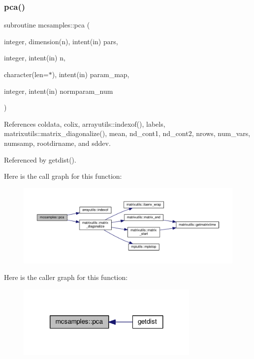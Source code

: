 \subsubsection{\texorpdfstring{pca()}{pca()}}
{\footnotesize\ttfamily subroutine mcsamples\+::pca (\begin{DoxyParamCaption}\item[{integer, dimension(n), intent(in)}]{pars,  }\item[{integer, intent(in)}]{n,  }\item[{character(len=$\ast$), intent(in)}]{param\+\_\+map,  }\item[{integer, intent(in)}]{normparam\+\_\+num }\end{DoxyParamCaption})}



References coldata, colix, arrayutils\+::indexof(), labels, matrixutils\+::matrix\+\_\+diagonalize(), mean, nd\+\_\+cont1, nd\+\_\+cont2, nrows, num\+\_\+vars, numsamp, rootdirname, and sddev.



Referenced by getdist().

Here is the call graph for this function\+:
\nopagebreak
\begin{figure}[H]
\begin{center}
\leavevmode
\includegraphics[width=350pt]{namespacemcsamples_a72e8a848ae68643f3449e12e33334870_cgraph}
\end{center}
\end{figure}
Here is the caller graph for this function\+:
\nopagebreak
\begin{figure}[H]
\begin{center}
\leavevmode
\includegraphics[width=252pt]{namespacemcsamples_a72e8a848ae68643f3449e12e33334870_icgraph}
\end{center}
\end{figure}
\mbox{\label{namespacemcsamples_a12e5ebfb72dd60020dd1aef9afa7ad2e}} 
